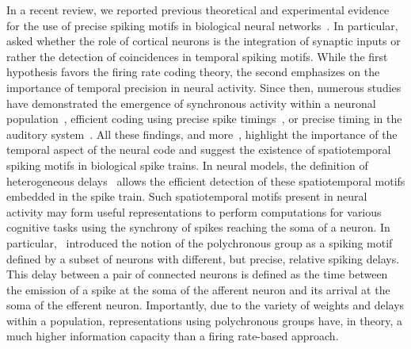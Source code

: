 \documentclass[default]{sn-jnl}%
\theoremstyle{thmstyleone}%
\theoremstyle{thmstyletwo}%
\theoremstyle{thmstylethree}%
\begin{document}
In a recent review, we reported previous theoretical and  experimental evidence for the use of precise spiking motifs in biological neural networks~\cite{grimaldi_precise_2023}. In particular, \citet{abeles_role_1982} asked whether the role of cortical neurons is the integration of synaptic inputs or rather the detection of coincidences in temporal spiking motifs. While the first hypothesis favors the firing rate coding theory, the second emphasizes on the importance of temporal precision in neural activity. Since then, numerous studies have demonstrated the emergence of synchronous activity within a neuronal population~\citep{riehle_spike_1997, davis_spontaneous_2021}, efficient coding using precise spike timings~\citep{Perrinet2002,perrinet_coding_2004, gollisch_rapid_2008}, or precise timing in the auditory system~\citep{deweese_binary_2002, carr_circuit_1990}. All these findings, and more~\citep{bohte_evidence_2004}, highlight the importance of the temporal aspect of the neural code and suggest the existence of spatiotemporal spiking motifs in biological spike trains. In neural models, the definition of heterogeneous delays~\citep{guise_bayesian_2014, zhang_supervised_2020, nadafian_bio-plausible_2020} allows the efficient detection of these spatiotemporal motifs embedded in the spike train. Such spatiotemporal motifs present in neural activity may form useful representations to perform computations for various cognitive tasks using the synchrony of spikes reaching the soma of a neuron. In particular,~\citet{izhikevich_polychronization_2006} introduced the notion of the polychronous group as a spiking motif defined by a subset of neurons with different, but precise, relative spiking delays. This delay between a pair of connected neurons is defined as the time between the emission of a spike at the soma of the afferent neuron and its arrival at the soma of the efferent neuron. Importantly, due to the variety of weights and delays within a population, representations using polychronous groups have, in theory, a much higher information capacity than a firing rate-based approach.
\end{document}
